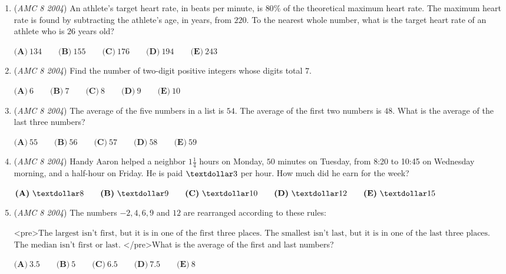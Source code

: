 \begin{enumerate}
 $\textbf{(A)}\ 1\qquad\textbf{(B)}\ 2\qquad\textbf{(C)}\ 3\qquad\textbf{(D)}\ 4\qquad\textbf{(E)}\ 5$


	\item (\textit{AMC 8 2004}) An athlete's target heart rate, in beats per minute, is $80\%$ of the theoretical maximum heart rate. The maximum heart rate is found by subtracting the athlete's age, in years, from $220$. To the nearest whole number, what is the target heart rate of an athlete who is $26$ years old?


 $\textbf{(A)}\ 134\qquad\textbf{(B)}\ 155\qquad\textbf{(C)}\ 176\qquad\textbf{(D)}\ 194\qquad\textbf{(E)}\ 243$


	\item (\textit{AMC 8 2004}) Find the number of two-digit positive integers whose digits total $7$.


 $\textbf{(A)}\ 6 \qquad\textbf{(B)}\ 7 \qquad\textbf{(C)}\ 8 \qquad\textbf{(D)}\ 9 \qquad\textbf{(E)}\ 10$


	\item (\textit{AMC 8 2004}) The average of the five numbers in a list is $54$. The average of the first two
numbers is $48$. What is the average of the last three numbers?


 $\textbf{(A)}\ 55\qquad\textbf{(B)}\ 56\qquad\textbf{(C)}\ 57\qquad\textbf{(D)}\ 58\qquad\textbf{(E)}\ 59$


	\item (\textit{AMC 8 2004}) Handy Aaron helped a neighbor $1 \frac14$ hours on Monday, $50$ minutes on Tuesday, from 8:20 to 10:45 on Wednesday morning, and a half-hour on Friday. He is paid $\textdollar 3$ per hour. How much did he earn for the week?


 $\textbf{(A)}\ \textdollar 8 \qquad \textbf{(B)}\ \textdollar 9 \qquad \textbf{(C)}\ \textdollar 10 \qquad \textbf{(D)}\ \textdollar 12 \qquad \textbf{(E)}\ \textdollar 15$


	\item (\textit{AMC 8 2004}) The numbers $-2, 4, 6, 9$ and $12$ are rearranged according to these rules:


 <pre>$\text {The largest isn’t first, but it is in one of the first three places.}$                                                          
$\text {The smallest isn’t last, but it is in one of the last three places.}$          
$\text {The median isn’t first or last.}$                     
</pre>What is the average of the first and last numbers?


 $\textbf{(A)}\ 3.5 \qquad \textbf{(B)}\ 5 \qquad \textbf{(C)}\ 6.5 \qquad \textbf{(D)}\ 7.5 \qquad \textbf{(E)}\ 8$



\end{enumerate}
